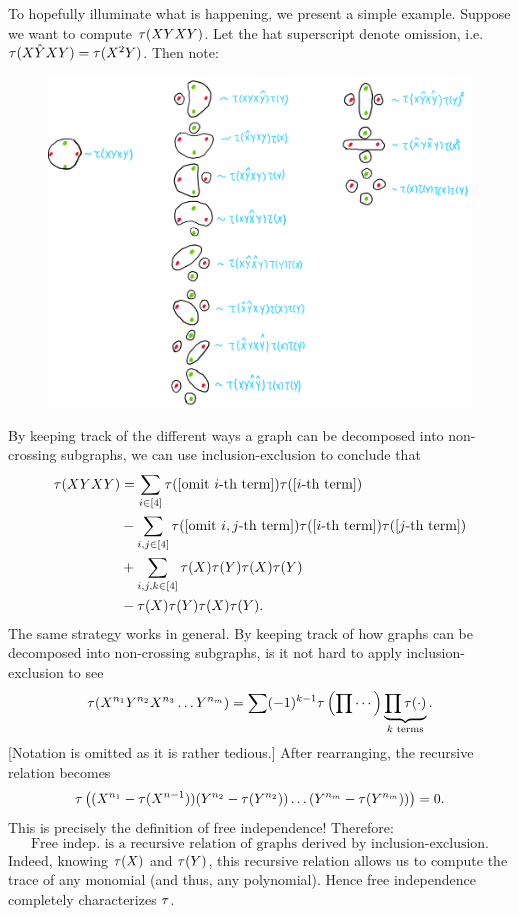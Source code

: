To hopefully illuminate what is happening, we present a simple example. Suppose we want to compute $\tau(XYXY)$. Let the hat superscript denote omission, i.e. $\tau(X\hat{Y}XY) = \tau(X^2Y)$. Then note:
\begin{figure}[H]
    \centering
    \includegraphics[width=0.9\linewidth]{figures/xyxy.png}
\end{figure}
By keeping track of the different ways a graph can be decomposed into non-crossing subgraphs, we can use inclusion-exclusion to conclude that
\[
    \begin{split}
        \tau(XYXY) & = \sum_{i \in [4]} \tau(\text{[omit $i$-th term]})\tau(\text{[$i$-th term]})                             \\
                 & - \sum_{i,j \in [4]} \tau(\text{[omit $i,j$-th term]})\tau(\text{[$i$-th term]})\tau(\text{[$j$-th term]}) \\
                 & + \sum_{i,j,k \in [4]} \tau(X)\tau(Y)\tau(X)\tau(Y)                                                          \\
                 & - \tau(X)\tau(Y)\tau(X)\tau(Y).
    \end{split}
\]
The same strategy works in general. By keeping track of how graphs can be decomposed into non-crossing subgraphs, is it not hard to apply inclusion-exclusion to see
\[
    \tau(X^{n_1}Y^{n_2}X^{n_3}\dots Y^{n_m}) = \sum (-1)^{k-1}\tau\left( \prod \cdots \right) \underbrace{\prod \tau(\cdot)}_{\text{$k$ terms}}.
\]
[Notation is omitted as it is rather tedious.] After rearranging, the recursive relation becomes
\[
    \tau\left( (X^{n_1} - \tau(X^{n-1})) (Y^{n_2} - \tau(Y^{n_2}))\dots (Y^{n_m} - \tau(Y^{n_m})) \right) = 0.
\]
This is precisely the definition of free independence! Therefore:
\[
    \boxed{\text{Free indep. is a recursive relation of graphs derived by inclusion-exclusion.}}
\]
Indeed, knowing $\tau(X)$ and $\tau(Y)$, this recursive relation allows us to compute the trace of any monomial (and thus, any polynomial). Hence free independence completely characterizes $\tau$.

